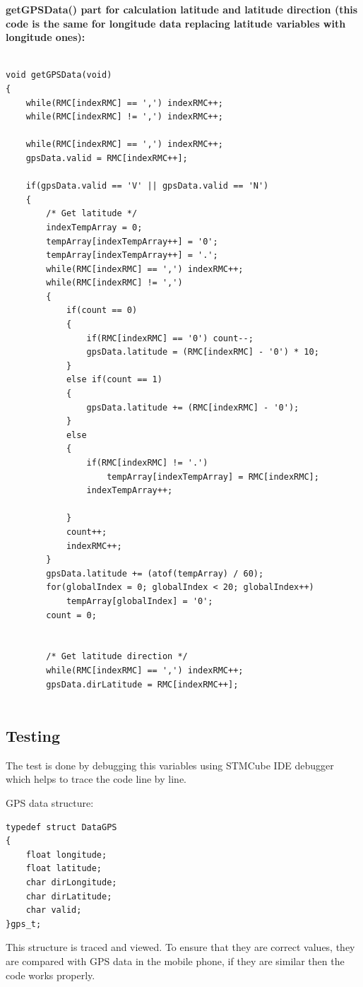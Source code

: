 \textbf{getGPSData() part for calculation latitude and latitude direction (this code is the same for longitude data replacing latitude variables with longitude ones):}

\begin{lstlisting}

void getGPSData(void)
{
	while(RMC[indexRMC] == ',') indexRMC++;
	while(RMC[indexRMC] != ',') indexRMC++;

	while(RMC[indexRMC] == ',') indexRMC++;
	gpsData.valid = RMC[indexRMC++];

	if(gpsData.valid == 'V' || gpsData.valid == 'N')
	{
		/* Get latitude */
		indexTempArray = 0;
		tempArray[indexTempArray++] = '0';
		tempArray[indexTempArray++] = '.';
		while(RMC[indexRMC] == ',') indexRMC++;
		while(RMC[indexRMC] != ',')
		{
			if(count == 0)
			{
				if(RMC[indexRMC] == '0') count--;
				gpsData.latitude = (RMC[indexRMC] - '0') * 10;
			}
			else if(count == 1)
			{
				gpsData.latitude += (RMC[indexRMC] - '0');
			}
			else
			{
				if(RMC[indexRMC] != '.')
					tempArray[indexTempArray] = RMC[indexRMC];
				indexTempArray++;

			}
			count++;
			indexRMC++;
		}
		gpsData.latitude += (atof(tempArray) / 60);
		for(globalIndex = 0; globalIndex < 20; globalIndex++)
			tempArray[globalIndex] = '0';
		count = 0;


		/* Get latitude direction */
		while(RMC[indexRMC] == ',') indexRMC++;
		gpsData.dirLatitude = RMC[indexRMC++];


\end{lstlisting}

\subsection{Testing}

The test is done by debugging this variables using STMCube IDE debugger which helps to trace the code line by line.

GPS data structure:
\begin{lstlisting}
typedef struct DataGPS
{
	float longitude;
	float latitude;
	char dirLongitude;
	char dirLatitude;
	char valid;
}gps_t;

\end{lstlisting}

This structure is traced and viewed. To ensure that they are correct values, they are compared with GPS data in the mobile phone, if they are similar then the code works properly. \\

